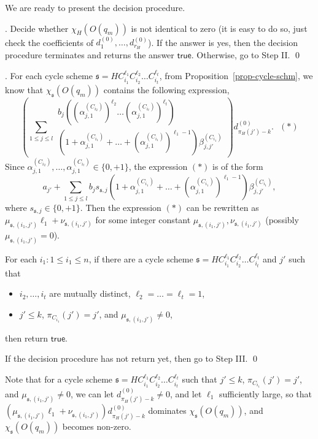 \documentclass[runningheads,a4paper]{llncs}
\def\schm{{\mathfrak{s} }}
\newcommand\ltrue{\mathsf{true}}
\begin{document}
We are ready to present the decision procedure.

\smallskip

. Decide whether $\chi_H(O(q_m))$ is not identical to zero (it is easy to do so, just check the coefficients of $d^{(0)}_1, \dots, d^{(0)}_{r_H}$). If the answer is yes, then the decision procedure terminates and returns the answer $\ltrue$. Otherwise, go to Step II. \qed

\smallskip

. For each cycle scheme $\schm=HC_{i_1}^{\ell_1} C_{i_2}^{\ell_2} \dots C_{i_t}^{\ell_t}$, from Proposition~\ref{prop-cycle-schm}, we know that $\chi_{\schm}(O(q_m))$ contains the following expression,
\[
\left(\sum \limits_{1 \le j \le l} 
\begin{array}{l}
b_j \left((\alpha^{(C_{i_2})}_{j,1})^{\ell_2} \dots (\alpha^{(C_{i_t})}_{j,1})^{\ell_t}\right) \\
\left(1+\alpha^{(C_{i_1})}_{j,1} + \dots + (\alpha^{(C_{i_1})}_{j,1})^{\ell_1-1} \right) \beta^{(C_{i_1})}_{j,j'}
\end{array}
\right) d^{(0)}_{\pi_H(j')-k}. \ \ \  (\ast)
\]
Since $\alpha^{(C_{i_2})}_{j,1}, \dots, \alpha^{(C_{i_t})}_{j,1} \in \{0,+1\}$, the expression $(\ast)$ is of the form 
\[
a_{j'} + \sum \limits_{1 \le j \le l} b_j  s_{\schm,j} \left(1+\alpha^{(C_{i_1})}_{j,1} + \dots +(\alpha^{(C_{i_1})}_{j,1})^{\ell_1-1} \right) \beta^{(C_{i_1})}_{j,j'},
\]
where $s_{\schm,j} \in \{0,+1\}$. Then the expression $(\ast)$ can be rewritten as $\mu_{\schm, (i_1,j')} \ell_1 + \nu_{\schm, (i_1,j')}$ for some integer constant $\mu_{\schm, (i_1,j')},\nu_{\schm, (i_1,j')}$ (possibly $\mu_{\schm, (i_1,j')}=0$). 

For each $i_1: 1 \le i_1 \le n$, if there are a cycle scheme $\schm=HC_{i_1}^{\ell_1} C_{i_2}^{\ell_2} \dots C_{i_t}^{\ell_t}$  and $j'$ such that 
\begin{itemize}
\item $i_2,\dots,i_t$ are mutually distinct, $\ell_2 = \dots = \ell_t = 1$, 
%
\item $j' \le k$, $\pi_{C_{i_1}}(j')=j'$, and $\mu_{\schm,(i_1,j')} \neq 0$, 
\end{itemize}
then return $\ltrue$.

If the decision procedure has not return yet, then go to Step III. \qed

\smallskip

Note that for a cycle scheme $\schm=HC_{i_1}^{\ell_1} C_{i_2}^{\ell_2} \dots C_{i_t}^{\ell_t}$ such that $j' \le k$, $\pi_{C_{i_1}}(j')=j'$, and $\mu_{\schm,(i_1,j')} \neq 0$, we can let $d^{(0)}_{\pi_H(j')-k} \neq 0$, and let $\ell_1$ sufficiently large, so that $(\mu_{\schm,(i_1,j')} \ell_1 + \nu_{\schm,(i_1,j')})d^{(0)}_{\pi_H(j')-k}$ dominates $\chi_{\schm}(O(q_m))$, and  $\chi_{\schm}(O(q_m))$ becomes non-zero. 
\end{document}
